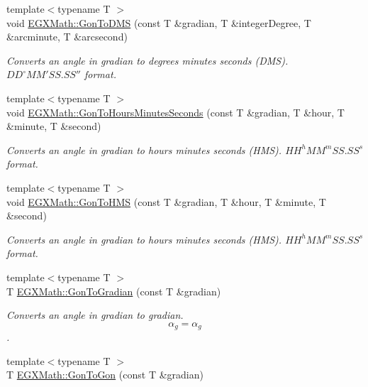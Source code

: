 \begin{DoxyCompactItemize}
{\footnotesize template$<$typename T $>$ }\\void \mbox{\hyperlink{group___e_g_x_math-_angle_conversions-_gon_ga14b45561114365c4707d40e3b8b57667}{E\+G\+X\+Math\+::\+Gon\+To\+D\+MS}} (const T \&gradian, T \&integer\+Degree, T \&arcminute, T \&arcsecond)
\begin{DoxyCompactList}\small\item\em Converts an angle in gradian to degrees minutes seconds (D\+MS). ${DD}^{\circ}{MM}'{SS.SS}''$ format. \end{DoxyCompactList}\item 
{\footnotesize template$<$typename T $>$ }\\void \mbox{\hyperlink{group___e_g_x_math-_angle_conversions-_gon_gaafdd71fd185afe7aa91f5c3ca531b668}{E\+G\+X\+Math\+::\+Gon\+To\+Hours\+Minutes\+Seconds}} (const T \&gradian, T \&hour, T \&minute, T \&second)
\begin{DoxyCompactList}\small\item\em Converts an angle in gradian to hours minutes seconds (H\+MS). ${HH}^h{MM}^m{SS.SS}^s$ format. \end{DoxyCompactList}\item 
{\footnotesize template$<$typename T $>$ }\\void \mbox{\hyperlink{group___e_g_x_math-_angle_conversions-_gon_gac7263c178052895c8b1a71190b62aabc}{E\+G\+X\+Math\+::\+Gon\+To\+H\+MS}} (const T \&gradian, T \&hour, T \&minute, T \&second)
\begin{DoxyCompactList}\small\item\em Converts an angle in gradian to hours minutes seconds (H\+MS). ${HH}^h{MM}^m{SS.SS}^s$ format. \end{DoxyCompactList}\item 
{\footnotesize template$<$typename T $>$ }\\T \mbox{\hyperlink{group___e_g_x_math-_angle_conversions-_gon_ga69eb507d44c7a0bfc5660ed3ebcc2f1a}{E\+G\+X\+Math\+::\+Gon\+To\+Gradian}} (const T \&gradian)
\begin{DoxyCompactList}\small\item\em Converts an angle in gradian to gradian. \[\alpha_{g}=\alpha_{g}\]. \end{DoxyCompactList}\item 
{\footnotesize template$<$typename T $>$ }\\T \mbox{\hyperlink{group___e_g_x_math-_angle_conversions-_gon_ga9f2fb553662f3367fc65b5de24128a27}{E\+G\+X\+Math\+::\+Gon\+To\+Gon}} (const T \&gradian)

\end{DoxyCompactItemize}
